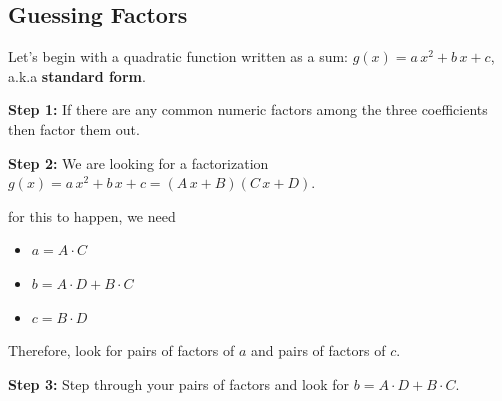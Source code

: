 \documentclass{ximera}
\begin{document}
\subsection*{Guessing Factors}


Let's begin with a quadratic function written as a sum: $g(x) = a \, x^2 + b \, x + c$, a.k.a \textbf{standard form}.  


\textbf{\textcolor{blue!75!black}{Step 1:}} If there are any common numeric factors among the three coefficients then factor them out.


\textbf{\textcolor{blue!75!black}{Step 2:}} We are looking for a factorization $g(x) = a \, x^2 + b \, x + c = (A \, x + B)(C \, x + D)$.

for this to happen, we need

\begin{itemize}
\item $a = A \cdot C $
\item $b = A\cdot D + B \cdot C$
\item $c = B \cdot D$
\end{itemize}

Therefore, look for pairs of factors of $a$ and pairs of factors of $c$.






\textbf{\textcolor{blue!75!black}{Step 3:}} Step through your pairs of factors and look for $b = A \cdot D + B \cdot C$.
\end{document}
